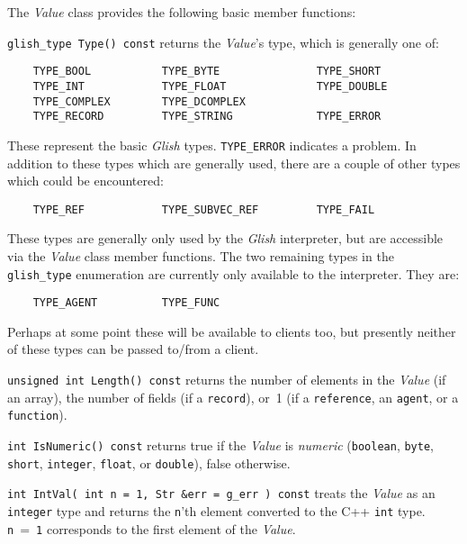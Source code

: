 The {\em Value} class provides the following basic member functions:
\begin{sloppy}
\begin{list}{}{}

\item[{\tt glish\_type Type() const}]
returns the {\em Value\/}'s type, which is generally one of:
\begin{verbatim}
    TYPE_BOOL           TYPE_BYTE               TYPE_SHORT
    TYPE_INT            TYPE_FLOAT              TYPE_DOUBLE
    TYPE_COMPLEX        TYPE_DCOMPLEX
    TYPE_RECORD         TYPE_STRING             TYPE_ERROR
\end{verbatim}
These represent the basic {\em Glish} types. {\tt TYPE\_ERROR} indicates
a problem. In addition to these types which are generally used,
there are a couple of other types which could be encountered:
\begin{verbatim}
    TYPE_REF            TYPE_SUBVEC_REF         TYPE_FAIL
\end{verbatim}
These types are generally only used by the {\em Glish} interpreter, but
are accessible via the {\em Value} class member functions. The two
remaining types in the {\tt glish\_type} enumeration are currently
only available to the interpreter. They are:
\begin{verbatim}
    TYPE_AGENT          TYPE_FUNC
\end{verbatim}
Perhaps at some point these will be available to clients too, but
presently neither of these types can be passed to/from a client.

\item[{\tt unsigned int Length() const}]
returns the number of elements
in the {\em Value\/} (if an array), the number of fields (if a
{\tt record}),
or~1 (if a {\tt reference}, an {\tt agent}, or a {\tt function}).

\item[{\tt int IsNumeric() const}]
returns true if the {\em Value}
is {\em numeric} ({\tt boolean}, {\tt byte}, {\tt short},
{\tt integer}, {\tt float}, or {\tt double}),
false otherwise.

\item[{\tt int IntVal( int n = 1, Str \&err = g\_err ) const}]
\label{value-intval}
treats the {\em Value} as
an {\tt integer} type and returns the {\tt n}'th element converted to
the C++ {\tt int} type.  {\tt n}~=~{\tt 1} corresponds to the first
element of the {\em Value\/}.


\end{list}
\end{sloppy}
